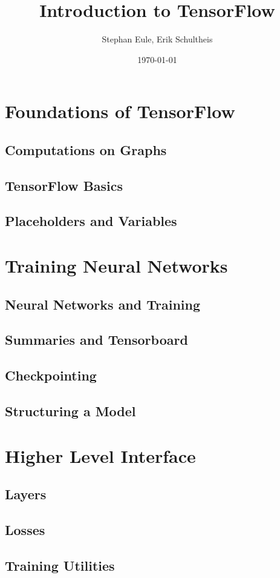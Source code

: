 \documentclass[aspectratio=1610]{beamer}
\title{Introduction to TensorFlow}
\author{Stephan Eule, Erik Schultheis}
\date{\today}
\begin{document}
\frame{\titlepage}
\frame{\tableofcontents}
\section{Foundations of TensorFlow}
\subsection{Computations on Graphs}


\subsection{TensorFlow Basics}


\subsection{Placeholders and Variables}


\section{Training Neural Networks}
\subsection{Neural Networks and Training}


\subsection{Summaries and Tensorboard}
{}

\subsection{Checkpointing}


\subsection{Structuring a Model}


\section{Higher Level Interface}
\subsection{Layers}


\subsection{Losses}


\subsection{Training Utilities}


\end{document}
